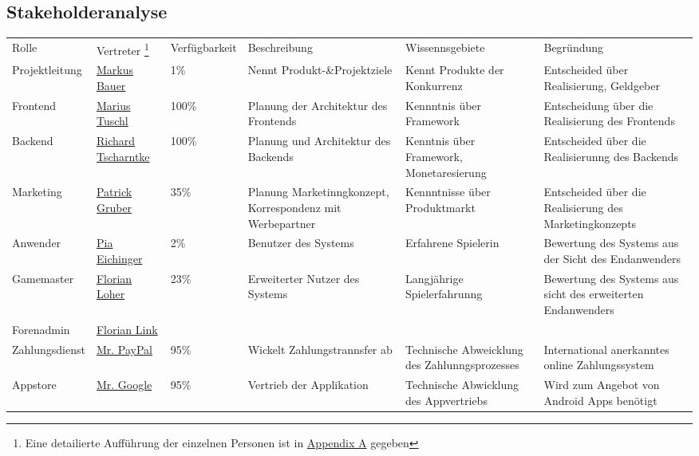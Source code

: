 \documentclass[DIV=13, 10pt,a4paper]{scrartcl}
\newcommand{\colorcell}[1]{\cellcolor{namecolor}\color{white}\textbf{#1}}
\begin{document}
\begin{landscape}
	\thispagestyle{empty}
	\small
\section{Stakeholderanalyse}
	\begin{tabularx}{1.2\paperwidth}{|>{\cellcolor{namecolor!25}}l|l|l|X|X|X|}
		\hline
		\multicolumn{6}{|l|}{\colorcell{Stakeholderübersicht}}\\
		\hline
		\rowcolor{namecolor!25}
		Rolle&Vertreter
		\footnote{Eine detailierte Aufführung der einzelnen Personen ist in \hyperref[app:A_Personen]{Appendix A} gegeben}&Verfügbarkeit&Beschreibung &Wissennsgebiete&Begründung\\
		\hline
		Projektleitung&\hyperref[person:MarkusBauer]{Markus Bauer}&1\%& Nennt Produkt-\&Projektziele&Kennt Produkte der Konkurrenz&Entscheided über Realisierung, Geldgeber\\
		\hline
		Frontend&\hyperref[person:MariusTuschl]{Marius Tuschl}&100\%&Planung der Architektur des Frontends& Kennntnis über Framework &Entscheidung über die Realisierung des Frontends\\
		\hline
		Backend&\hyperref[person:RichardTscharntke]{Richard Tscharntke}&100\%&Planung und Architektur des Backends&Kenntnis über Framework, Monetaresierung&Entscheided über die Realisierunng des Backends\\
		\hline
		Marketing&\hyperref[person:PatrickGruber]{Patrick Gruber}&35\%&Planung Marketinngkonzept, Korrespondenz mit Werbepartner&Kennntnisse über Produktmarkt&Entscheided über die Realisierung des Marketingkonzepts\\
		\hline
		Anwender&\hyperref[person:PiaEichinger]{Pia Eichinger}&2\%&Benutzer des Systems&Erfahrene Spielerin&Bewertung des Systems aus der Sicht des Endanwenders\\
		\hline
		Gamemaster&\hyperref[person:FlorianLoher]{Florian Loher}&23\%&Erweiterter Nutzer des Systems&Langjährige Spielerfahrunng&Bewertung des Systems aus sicht des erweiterten Endanwenders\\
		\hline
		Forenadmin&\hyperref[person:FlorianLink]{Florian Link}&&&&\\
		\hline
		Zahlungsdienst&\hyperref[person:MrPayPal]{Mr. PayPal}&95\%&Wickelt Zahlungstrannsfer ab&Technische Abweicklung des Zahlunngsprozesses&International anerkanntes online Zahlungssystem\\
		\hline
		Appstore&\hyperref[person:MrGoogle]{Mr. Google}&95\%&Vertrieb der Applikation&Technische Abwicklung des Appvertriebs&Wird zum Angebot von Android Apps benötigt\\
		\hline
\end{tabularx}
\restoregeometry
\end{landscape}
\end{document}
